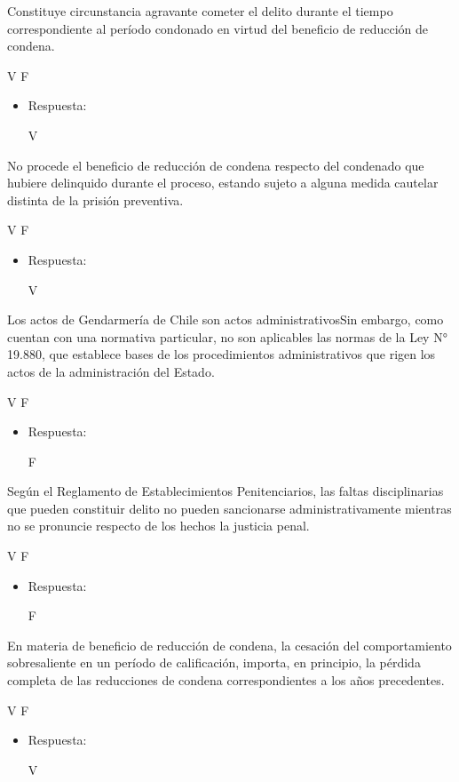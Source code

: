 \documentclass[letterpaper, 11pt]{article}
\begin{document}
Constituye circunstancia agravante cometer el delito durante el tiempo
correspondiente al período condonado en virtud del beneficio de
reducción de condena.

V F

\begin{itemize}
\item Respuesta:

V
\end{itemize}

No procede el beneficio de reducción de condena respecto del condenado
que hubiere delinquido durante el proceso, estando sujeto a alguna
medida cautelar distinta de la prisión preventiva.

V F

\begin{itemize}
\item Respuesta:

V
\end{itemize}

Los actos de Gendarmería de Chile son actos administrativosSin
embargo, como cuentan con una normativa particular, no son aplicables
las normas de la Ley N° 19.880, que establece bases de los
procedimientos administrativos que rigen los actos de la
administración del Estado.

V F

\begin{itemize}
\item Respuesta:

F
\end{itemize}


Según el Reglamento de Establecimientos Penitenciarios, las faltas
disciplinarias que pueden constituir delito no pueden sancionarse
administrativamente mientras no se pronuncie respecto de los hechos la
justicia penal.

V F

\begin{itemize}
\item Respuesta:

F
\end{itemize}


En materia de beneficio de reducción de condena, la cesación del
comportamiento sobresaliente en un período de calificación, importa,
en principio, la pérdida completa de las reducciones de condena
correspondientes a los años precedentes.

V F

\begin{itemize}
\item Respuesta:

V
\end{itemize}
\end{document}
